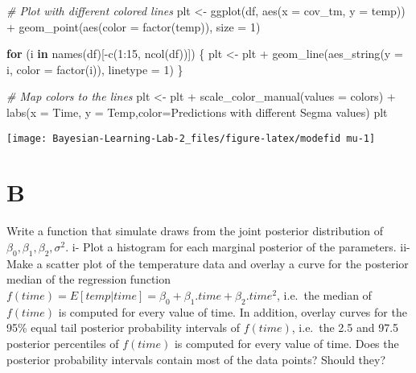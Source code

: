 \documentclass[
]{article}
\newenvironment{Shaded}{\begin{snugshade}}{\end{snugshade}}
\newcommand{\AttributeTok}[1]{\textcolor[rgb]{0.77,0.63,0.00}{#1}}
\newcommand{\CommentTok}[1]{\textcolor[rgb]{0.56,0.35,0.01}{\textit{#1}}}
\newcommand{\ControlFlowTok}[1]{\textcolor[rgb]{0.13,0.29,0.53}{\textbf{#1}}}
\newcommand{\DecValTok}[1]{\textcolor[rgb]{0.00,0.00,0.81}{#1}}
\newcommand{\FunctionTok}[1]{\textcolor[rgb]{0.00,0.00,0.00}{#1}}
\newcommand{\NormalTok}[1]{#1}
\newcommand{\OtherTok}[1]{\textcolor[rgb]{0.56,0.35,0.01}{#1}}
\newcommand{\SpecialCharTok}[1]{\textcolor[rgb]{0.00,0.00,0.00}{#1}}
\newcommand{\StringTok}[1]{\textcolor[rgb]{0.31,0.60,0.02}{#1}}
\begin{document}
\begin{Shaded}
\begin{Highlighting}[]
\CommentTok{\# Plot with different colored lines}
\NormalTok{plt }\OtherTok{\textless{}{-}} \FunctionTok{ggplot}\NormalTok{(df, }\FunctionTok{aes}\NormalTok{(}\AttributeTok{x =}\NormalTok{ cov\_tm, }\AttributeTok{y =}\NormalTok{ temp)) }\SpecialCharTok{+}
  \FunctionTok{geom\_point}\NormalTok{(}\FunctionTok{aes}\NormalTok{(}\AttributeTok{color =} \FunctionTok{factor}\NormalTok{(}\StringTok{\textquotesingle{}temp\textquotesingle{}}\NormalTok{)), }\AttributeTok{size =} \DecValTok{1}\NormalTok{)}

\ControlFlowTok{for}\NormalTok{ (i }\ControlFlowTok{in} \FunctionTok{names}\NormalTok{(df)[}\SpecialCharTok{{-}}\FunctionTok{c}\NormalTok{(}\DecValTok{1}\SpecialCharTok{:}\DecValTok{15}\NormalTok{, }\FunctionTok{ncol}\NormalTok{(df))]) \{}
\NormalTok{  plt }\OtherTok{\textless{}{-}}\NormalTok{ plt }\SpecialCharTok{+} \FunctionTok{geom\_line}\NormalTok{(}\FunctionTok{aes\_string}\NormalTok{(}\AttributeTok{y =}\NormalTok{ i, }\AttributeTok{color =} \FunctionTok{factor}\NormalTok{(i)), }\AttributeTok{linetype =} \DecValTok{1}\NormalTok{)}
\NormalTok{\}}

\CommentTok{\# Map colors to the lines}
\NormalTok{plt }\OtherTok{\textless{}{-}}\NormalTok{ plt }\SpecialCharTok{+}
  \FunctionTok{scale\_color\_manual}\NormalTok{(}\AttributeTok{values =}\NormalTok{ colors) }\SpecialCharTok{+}
  \FunctionTok{labs}\NormalTok{(}\AttributeTok{x =} \StringTok{\textquotesingle{}Time\textquotesingle{}}\NormalTok{, }\AttributeTok{y =} \StringTok{\textquotesingle{}Temp\textquotesingle{}}\NormalTok{,}\AttributeTok{color=}\StringTok{\textquotesingle{}Predictions with different Segma values\textquotesingle{}}\NormalTok{) }
\NormalTok{plt}
\end{Highlighting}
\end{Shaded}

\begin{center}\texttt{[image: Bayesian-Learning-Lab-2\_files/figure-latex/modefid mu-1]} \end{center}

\hypertarget{b}{%
\section{B}\label{b}}

Write a function that simulate draws from the joint posterior
distribution of \(\beta_0, \beta_1, \beta_2,\sigma^2\). i- Plot a
histogram for each marginal posterior of the parameters. ii- Make a
scatter plot of the temperature data and overlay a curve for the
posterior median of the regression function
\(f(time)=E[temp|time]=\beta_0+\beta_1.time+\beta_2.time^2\), i.e.~the
median of \(f(time)\) is computed for every value of time. In addition,
overlay curves for the 95\% equal tail posterior probability intervals
of \(f(time)\), i.e.~the 2.5 and 97.5 posterior percentiles of
\(f(time)\) is computed for every value of time. Does the posterior
probability intervals contain most of the data points? Should they?
\end{document}
